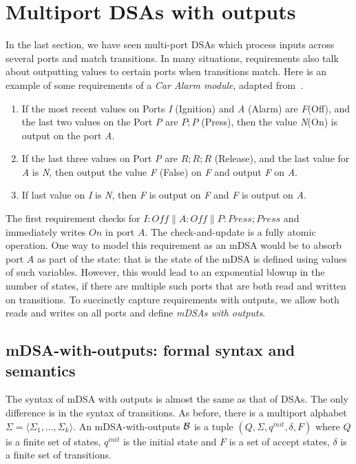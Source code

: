 \section{Multiport DSAs with outputs}

In the last section, we have seen multi-port DSAs which process inputs across several ports and match transitions. In many situations, requirements also talk about outputting values to certain ports when transitions match. Here is an example of some requirements of a \emph{Car Alarm module}, adapted from~\cite{DBLP:conf/enase/VenkateshSZA15a}. 
\begin{enumerate}
\item If the most recent values on Ports \emph{I} (Ignition) and \emph{A} (Alarm) are \emph{F}(Off), and the last two values on the Port \emph{P} are $P;P$ (Press), then
the value \emph{N}(On) is output on the port \emph{A}.

\item If the last three values on Port \emph{P} are $R;R;R$ (Release), and the last value for \emph{A} is \emph{N}, then output the value \emph{F} (False) on \emph{F}
and output \emph{F} on \emph{A}.

\item If last value on \emph{I} is \emph{N}, then \emph{F} is output on \emph{F} and \emph{F} is output on \emph{A}.
\end{enumerate}
The first requirement checks for $I:Off \parallel A:Off \parallel P:Press;Press$ and immediately writes $On$ in port $A$. The check-and-update is a fully atomic operation. One way to model this requirement as an mDSA would be to absorb port $A$ as part of the state: that is the state of the mDSA is defined using values of such variables. However, this would lead to an exponential blowup in the number of states, if there are multiple such ports that are both read and written on transitions. To succinctly capture requirements with outputs, we allow both reads and writes on all ports and define \emph{mDSAs with outputs}. 

\subsection{mDSA-with-outputs: formal syntax and semantics}

The syntax of mDSA with outputs is almost the same as that of DSAs. The only difference is in the syntax of transitions.  As before, there is a multiport alphabet $\Sigma = \langle \Sigma_1, \dots, \Sigma_k \rangle$. An mDSA-with-outputs $\mathcal{B}$ is a tuple $(Q, \Sigma, q^{init}, \delta, F)$ where $Q$ is a finite set of states, $q^{init}$ is the initial state and $F$ is a set of accept states, $\delta$ is a finite set of transitions.

